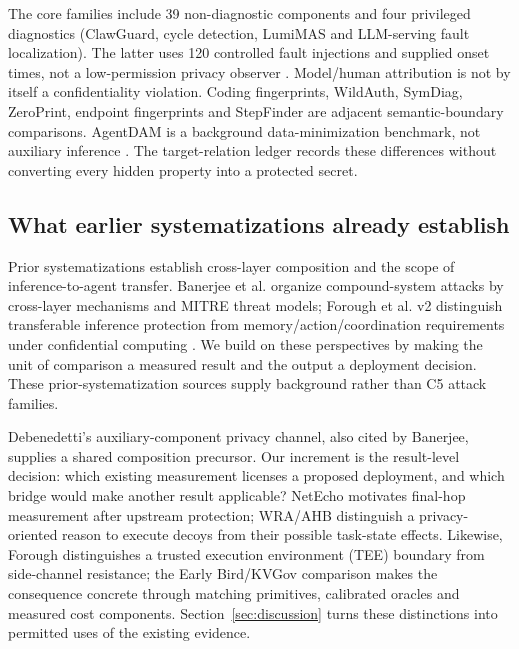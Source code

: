 The \FinalCore{} core families include 39 non-diagnostic components and four privileged diagnostics (ClawGuard, cycle detection, LumiMAS and LLM-serving fault localization). The latter uses 120 controlled fault injections and supplied onset times, not a low-permission privacy observer \cite{scheinert2026rca}. Model/human attribution is not by itself a confidentiality violation. Coding fingerprints, WildAuth, SymDiag, ZeroPrint, endpoint fingerprints and StepFinder are adjacent semantic-boundary comparisons. AgentDAM is a background data-minimization benchmark, not auxiliary inference \cite{ghaleb2026codingfingerprint,wang2026dialogue,cui2026symdiag,agentdam2025}. The target-relation ledger records these differences without converting every hidden property into a protected secret.

\subsection{What earlier systematizations already establish}
Prior systematizations establish cross-layer composition and the scope of inference-to-agent transfer. Banerjee et al. organize compound-system attacks by cross-layer mechanisms and MITRE threat models; Forough et al. v2 distinguish transferable inference protection from memory/action/coordination requirements under confidential computing \cite{banerjee2024compound,forough2026secrets}. We build on these perspectives by making the unit of comparison a measured result and the output a deployment decision. These prior-systematization sources supply background rather than C5 attack families.

Debenedetti's auxiliary-component privacy channel, also cited by Banerjee, supplies a shared composition precursor. Our increment is the result-level decision: which existing measurement licenses a proposed deployment, and which bridge would make another result applicable? NetEcho motivates final-hop measurement after upstream protection; WRA/AHB distinguish a privacy-oriented reason to execute decoys from their possible task-state effects. Likewise, Forough distinguishes a trusted execution environment (TEE) boundary from side-channel resistance; the Early Bird/KVGov comparison makes the consequence concrete through matching primitives, calibrated oracles and measured cost components. Section~\ref{sec:discussion} turns these distinctions into permitted uses of the existing evidence.

